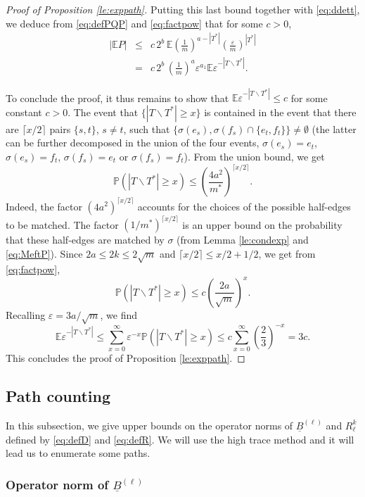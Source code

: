 \documentclass[11pt]{article}
\newcommand{\dE}{\mathbb {E}}
\newcommand{\dP}{\mathbb{P}}
\newcommand{\ABS}[1]{{{\left| #1 \right|}}} %
\newcommand{\PAR}[1]{{{\left(#1\right)}}} %
\newcommand{\uB}{{\underline B}}
\newcommand{\1}{1\!\!{\sf I}}\newcommand{\IND}{\1}
\newcommand{\veps}{\varepsilon}
\begin{document}
\begin{proof}[Proof of Proposition \ref{le:exppath}]
Putting this last bound together with \eqref{eq:ddett}, we deduce from \eqref{eq:defPQP} and \eqref{eq:factpow}  that for some $c >0$, 
\begin{eqnarray*}
\ABS{ \dE P   } &\leq &  c \, 2^b \, \dE \PAR{  \frac {1} m }^{a - |T^*| }   \PAR{ \frac{\veps  }{ m} }^{|T^*|}   \\
& = & c  \, 2^b \, \PAR{\frac{1}{m}}^{a} \veps^{a_1} \dE \veps^{-|T \backslash T^*|}.
\end{eqnarray*}

To conclude the proof, it thus remains to show that  $\dE \veps^{-|T \backslash T^*|} \leq c$ for some constant $c>0$. The event that $\{|T \backslash T^*| \geq x \}$ is contained in the event that there are $\lceil x / 2 \rceil$ pairs $\{s,t\}$, $s\ne t$, such  that $\{\sigma(e_s),\sigma(f_s) \cap \{ e_t , f_t \}\} \ne \emptyset$ (the latter can be further decomposed in the union of the four events, $\sigma(e_s) = e_t$, $\sigma(e_s) = f_t$, $\sigma(f_s) = e_t$ or $\sigma(f_s) = f_t$).  From the union bound, we get
$$
\dP \PAR{|T \backslash T^*| \geq x } \leq \PAR{ \frac{4 a^2}{m^*} }^{\lceil x / 2 \rceil}.
$$
Indeed, the factor $( 4 a^2 )^{\lceil x / 2 \rceil}$ accounts for the choices of the possible half-edges to be matched. The factor $(1/m^*)^{  \lceil x / 2 \rceil}$ is an upper bound on the probability that these half-edges are matched by $\sigma$ (from  Lemma \ref{le:condexp} and \eqref{eq:MeftP}). Since $2a \leq 2k \leq 2\sqrt{m}$ and $\lceil x / 2 \rceil \leq x/2 +1/2$, we get from \eqref{eq:factpow},
$$
\dP \PAR{|T \backslash T^*| \geq x } \leq c \PAR{ \frac{2 a}{\sqrt{m} } }^{x}.
$$
Recalling $\veps = 3a / \sqrt m$, we find 
$$
 \dE  \veps^{-|T \backslash T^*|} \leq \sum_{x=0}^\infty \veps^{-x} \dP ( |T \backslash T^*| \geq x) \leq c \sum_{x = 0}^{\infty}   \PAR{\frac 2 3}^{-x} = 3c.
$$
This concludes the proof of Proposition \ref{le:exppath}.
\end{proof}


\subsection{Path counting}

\label{subsec:PC}
In this subsection, we give upper bounds on the operator norms of $\uB^{(\ell)}$ and $R_\ell^{k}$ defined by \eqref{eq:defD} and \eqref{eq:defR}. We will use the high trace method and it will lead us to enumerate  some paths. 


\subsubsection{Operator norm of $\uB^{(\ell)}$}
\end{document}
